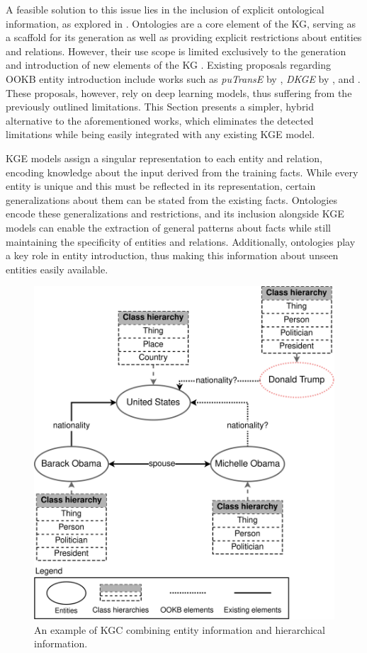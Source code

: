 A feasible solution to this issue lies in the inclusion of explicit ontological information, as explored in \cite{Patrick}. Ontologies are a core element of the KG, serving as a scaffold for its generation as well as providing explicit restrictions about entities and relations. However, their use scope is limited exclusively to the generation and introduction of new elements of the KG \citep{paulheim2017knowledge}. Existing proposals regarding OOKB entity introduction include works such as \textit{puTransE} by \cite{putranse}, \textit{DKGE} by \cite{dkge}, \cite{hamaguchi_etal} and \cite{shah_open-world_2019}. These proposals, however, rely on deep learning models, thus suffering from the previously outlined limitations. This Section presents a simpler, hybrid alternative to the aforementioned works, which eliminates the detected limitations while being easily integrated with any existing KGE model.


KGE models assign a singular representation to each entity and relation, encoding knowledge about the input derived from the training facts. While every entity is unique and this must be reflected in its representation, certain generalizations about them can be stated from the existing facts. Ontologies encode these generalizations and restrictions, and its inclusion alongside KGE models can enable the extraction of general patterns about facts while still maintaining the specificity of entities and relations. Additionally, ontologies play a key role in entity introduction, thus making this information about unseen entities easily available.

\begin{figure}
    \centering
    \includegraphics[width=.6\linewidth]{4_kbsintegrationdl/figures/KGCexample.eps}
    \caption{An example of KGC combining entity information and hierarchical information.}
    \label{fig:kgc_onto_example}
\end{figure}

